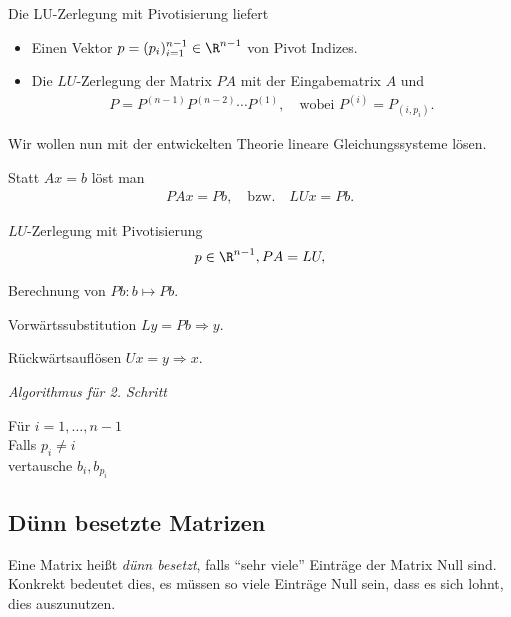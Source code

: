 Die LU-Zerlegung mit Pivotisierung liefert
\begin{itemize}
  \item Einen Vektor $p=(p_i)_{i=1}^{n-1}\in\R^{n-1}$ von Pivot Indizes.
  \item Die $LU$-Zerlegung der Matrix $PA$ mit der Eingabematrix $A$ und
\begin{align*}
P=P^{(n-1)}P^{(n-2)}\cdots P^{(1)},\quad\text{wobei  } P^{(i)} = P_{(i,p_i)}.
\end{align*}
\end{itemize}

Wir wollen nun mit der entwickelten Theorie lineare Gleichungssysteme lösen.

Statt $Ax = b$ löst man
\begin{align*}
PAx = Pb,\quad\text{bzw.}\quad LUx = Pb.
\end{align*}
\begin{bemn}[1. Schritt.]
$LU$-Zerlegung mit Pivotisierung
\begin{align*}
p\in\R^{n-1}, PA = LU,
\end{align*}
\end{bemn}
\begin{bemn}[2. Schritt.]
Berechnung von $Pb : b\mapsto Pb$.
\end{bemn}
\begin{bemn}[3. Schritt.]
Vorwärtssubstitution $Ly = Pb \Rightarrow y$.
\end{bemn}
\begin{bemn}[4. Schritt.]
Rückwärtsauflösen $Ux = y \Rightarrow x$.
\end{bemn}

\textit{Algorithmus für 2. Schritt}
\begin{tabbing}
\hspace{20pt}	Für $i=1,\ldots,n-1$\\
\hspace{40pt}		Falls $p_i\neq i$\\
\hspace{60pt}			vertausche $b_i, b_{p_i}$	
\end{tabbing}

\subsection{Dünn besetzte Matrizen}
\begin{defnn}
Eine Matrix heißt \emph{dünn besetzt}, falls ``sehr viele'' Einträge der Matrix
Null sind. Konkrekt bedeutet dies, es müssen so viele Einträge Null sein, dass
es sich lohnt, dies auszunutzen.\fishhere
\end{defnn}

